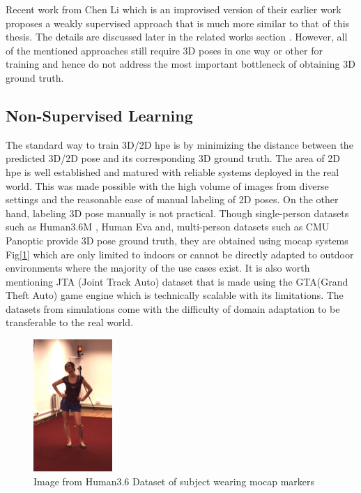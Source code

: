 Recent work from Chen Li \etal \cite{weaklymultiple} which is an improvised version of their earlier work \cite{multiplehypo} proposes a weakly supervised approach that is much more similar to that of this thesis. The details are discussed later in the related works section . However, all of the mentioned approaches still require 3D poses in one way or other for training and hence do not address the most important bottleneck of obtaining 3D ground truth. 

\subsection{Non-Supervised Learning}
\label{subsec:non_supervised_learning}
The standard way to train 3D/2D \ac{hpe} is by minimizing the distance between the predicted 3D/2D pose and its corresponding 3D ground truth. The area of 2D \ac{hpe} is well established and matured with reliable systems deployed in the real world. This was made possible with the high volume of images from diverse settings and the reasonable ease of manual labeling of 2D poses. On the other hand, labeling 3D pose manually is not practical. Though single-person datasets such as Human3.6M \cite{H3.6}, Human Eva \cite{HumanEva} and, multi-person datasets such as CMU Panoptic \cite{cmuPanoptic} provide 3D pose ground truth, they are obtained using \ac{mocap} systems Fig[\ref{fig:h36_mocap}] which are only limited to indoors or cannot be directly adapted to outdoor environments where the majority of the use cases exist. It is also worth mentioning JTA (Joint Track Auto) dataset \cite{JTA} that is made using the GTA(Grand Theft Auto) game engine which is technically scalable with its limitations. The datasets from simulations come with the difficulty of domain adaptation to be transferable to the real world.

\begin{figure}[h]
    \centering
    \includegraphics[width=30mm]{figures/h36/h36_mocap.png}
    \caption{Image from Human3.6 Dataset \cite{H3.6} of subject wearing \ac{mocap} markers}
    \label{fig:h36_mocap}
\end{figure}

